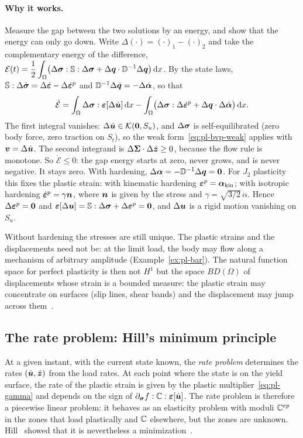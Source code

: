 \paragraph{Why it works.} Measure the gap between the two solutions by an
energy, and show that the energy can only go down. Write
$\Delta(\cdot)=(\cdot)_1-(\cdot)_2$ and take the complementary energy of the
difference,
$\displaystyle \mathcal E(t)=\frac12\int_\Omega\bigl(\Delta\bm{\sigma}:\mathbb{S}:\Delta\bm{\sigma}+\Delta\bm{q}\cdot\mathbb{D}^{-1}\Delta\bm{q}\bigr)\,\mathrm{d} x$.
By the state laws, $\mathbb{S}:\Delta\dot{\bm{\sigma}}=\Delta\dot{\bm{\varepsilon}}-\Delta\dot{\bm{\varepsilon}}^p$ and
$\mathbb{D}^{-1}\Delta\dot{\bm{q}}=-\Delta\dot{\bm{\alpha}}$, so that
\[
  \dot{\mathcal E}=\int_\Omega\Delta\bm{\sigma}:\bm{\varepsilon}[\Delta\dot{\bm{u}}]\,\mathrm{d} x
  -\int_\Omega\bigl(\Delta\bm{\sigma}:\Delta\dot{\bm{\varepsilon}}^p+\Delta\bm{q}\cdot\Delta\dot{\bm{\alpha}}\bigr)\,\mathrm{d} x .
\]
The first integral vanishes: $\Delta\dot{\bm{u}}\in\mathcal{K}(\bm{0},S_u)$, and
$\Delta\bm{\sigma}$ is self-equilibrated (zero body force, zero traction on $S_t$),
so the weak form~\eqref{eq:pl-bvp-weak} applies with $\bm{v}=\Delta\dot{\bm{u}}$. The
second integrand is $\Delta\bm{\Sigma}\cdot\Delta\dot{\bm{z}}\ge0$, because the flow
rule is monotone. So $\dot{\mathcal E}\le0$: the gap energy starts at zero,
never grows, and is never negative. It stays zero. With hardening,
$\Delta\bm{\alpha}=-\mathbb{D}^{-1}\Delta\bm{q}=\bm{0}$. For $J_2$ plasticity this fixes the
plastic strain: with kinematic hardening $\bm{\varepsilon}^{p}=\bm{\alpha}_{\mathrm{kin}}$; with
isotropic hardening $\dot{\bm{\varepsilon}}^p=\gamma\bm{n}$, where $\bm{n}$ is given by the stress
and $\gamma=\sqrt{3/2}\,\dot\alpha$. Hence $\Delta\bm{\varepsilon}^{p}=\bm{0}$ and
$\bm{\varepsilon}[\Delta\bm{u}]=\mathbb{S}:\Delta\bm{\sigma}+\Delta\bm{\varepsilon}^{p}=\bm{0}$, and $\Delta\bm{u}$ is a rigid
motion vanishing on $S_u$.

Without hardening the stresses are still unique. The plastic strains and the
displacements need not be: at the limit load, the body may flow along a
mechanism of arbitrary amplitude
(Example~\ref{ex:pl-bar}). The natural function space for perfect plasticity
is then not $H^1$ but the space $BD(\Omega)$ of displacements whose strain is a
bounded measure: the plastic strain may concentrate on surfaces (slip lines,
shear bands) and the displacement may jump across
them~\cite{Temam1983,HanReddy2013}.

\subsection{The rate problem: Hill's minimum principle}\label{ssec:pl-hill}
%
At a given instant, with the current state known, the \emph{rate problem}
determines the rates $(\dot{\bm{u}},\dot{\bm{z}})$ from the load rates. At each point
where the state is on the yield surface, the rate of the plastic strain is
given by the plastic multiplier~\eqref{eq:pl-gamma} and depends on the sign of
$\partial_{\bm{\sigma}}f:\mathbb{C}:\bm{\varepsilon}[\dot{\bm{u}}]$. The rate problem is therefore a
piecewise linear problem: it behaves as an elasticity problem with moduli
$\mathbb{C}^{ep}$ in the zones that load plastically and $\mathbb{C}$ elsewhere, but the
zones are unknown. Hill~\cite{Hill1958} showed that it is nevertheless a
minimization~\cite{Nguyen2000}.

